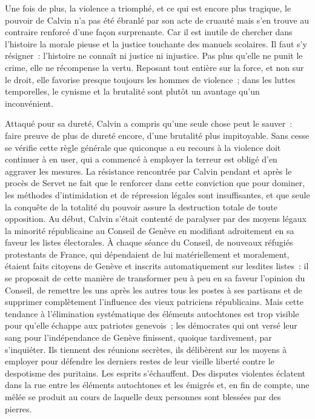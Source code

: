\documentclass[french,twoside]{book} %
\begin{document}
\noindent Une fois de plus, la violence a triomphé, et ce qui est encore plus tragique, le pouvoir de Calvin n’a pas été ébranlé par son acte de cruauté mais s’en trouve au contraire renforcé d’une façon surprenante. Car il est inutile de chercher dans l’histoire la morale pieuse et la justice touchante des manuels scolaires. Il faut s’y résigner : l’histoire ne connaît ni justice ni injustice. Pas plus qu’elle ne punit le crime, elle ne récompense la vertu. Reposant tout entière sur la force, et non sur le droit, elle favorise presque toujours les hommes de violence ; dans les luttes temporelles, le cynisme et la brutalité sont plutôt un avantage qu’un inconvénient.\par
Attaqué pour sa dureté, Calvin a compris qu’une seule chose peut le sauver : faire preuve de plus de dureté encore, d’une brutalité plus impitoyable. Sans cesse se vérifie cette règle générale que quiconque a eu recours à la violence doit continuer à en user, qui a commencé à employer la terreur est obligé d’en aggraver les mesures. La résistance rencontrée par Calvin pendant et après le procès de Servet ne fait que le renforcer dans cette conviction que pour dominer, les méthodes d’intimidation et de répression légales sont insuffisantes, et que seule la conquête de la totalité du pouvoir assure la destruction totale de toute opposition. Au début, Calvin s’était contenté de paralyser par des moyens légaux la minorité républicaine au Conseil de Genève en modifiant adroitement en sa faveur les listes électorales. À chaque séance du Conseil, de nouveaux réfugiés protestants de France, qui dépendaient de lui matériellement et moralement, étaient faits citoyens de Genève et inscrits automatiquement sur lesdites listes : il se proposait de cette manière de transformer peu à peu en sa faveur l’opinion du Conseil, de remettre les uns après les autres tous les postes à ses partisans et de supprimer complètement l’influence des vieux patriciens républicains. Mais cette tendance à l’élimination systématique des éléments autochtones est trop visible pour qu’elle échappe aux patriotes genevois ; les démocrates qui ont versé leur sang pour l’indépendance de Genève finissent, quoique tardivement, par s’inquiéter. Ils tiennent des réunions secrètes, ils délibèrent sur les moyens à employer pour défendre les derniers restes de leur vieille liberté contre le despotisme des puritains. Les esprits s’échauffent. Des disputes violentes éclatent dans la rue entre les éléments autochtones et les émigrés et, en fin de compte, une mêlée se produit au cours de laquelle deux personnes sont blessées par des pierres.\par
\end{document}
